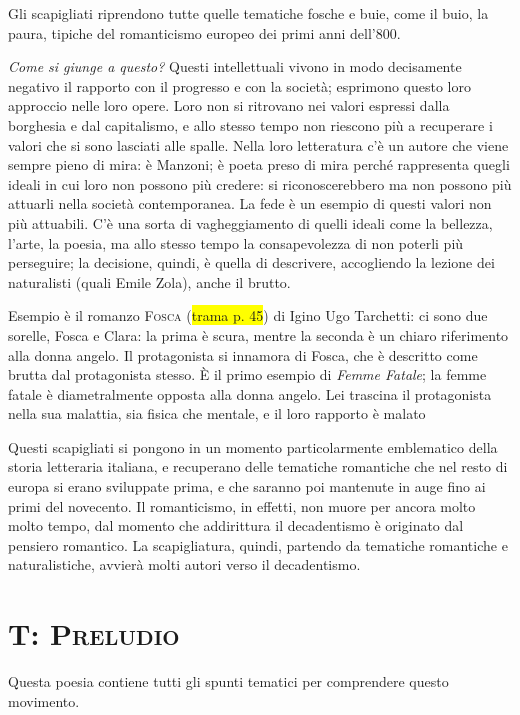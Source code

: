 \documentclass{book}
\newcommand{\pagine}[1]{\colorbox{yellow}{#1}}
\begin{document}
Gli scapigliati riprendono tutte quelle tematiche fosche e buie, come il
buio, la paura, tipiche del romanticismo europeo dei primi anni
dell'800.

\emph{Come si giunge a questo?} Questi intellettuali vivono in modo
decisamente negativo il rapporto con il progresso e con la società;
esprimono questo loro approccio nelle loro opere. Loro non si ritrovano
nei valori espressi dalla borghesia e dal capitalismo, e allo stesso
tempo non riescono più a recuperare i valori che si sono lasciati alle
spalle. Nella loro letteratura c'è un autore che viene sempre pieno di
mira: è Manzoni; è poeta preso di mira perché rappresenta quegli ideali
in cui loro non possono più credere: si riconoscerebbero ma non possono
più attuarli nella società contemporanea. La fede è un esempio di questi
valori non più attuabili. C'è una sorta di vagheggiamento di quelli
ideali come la bellezza, l'arte, la poesia, ma allo stesso tempo la
consapevolezza di non poterli più perseguire; la decisione, quindi, è
quella di descrivere, accogliendo la lezione dei naturalisti (quali
Emile Zola), anche il brutto.

Esempio è il romanzo \textsc{Fosca} (\pagine{trama p. 45}) di Igino Ugo
Tarchetti: ci sono due sorelle, Fosca e Clara: la prima è scura, mentre
la seconda è un chiaro riferimento alla donna angelo. Il protagonista si
innamora di Fosca, che è descritto come brutta dal protagonista stesso.
È il primo esempio di \emph{Femme Fatale}; la femme fatale è
diametralmente opposta alla donna angelo. Lei trascina il protagonista
nella sua malattia, sia fisica che mentale, e il loro rapporto è malato

Questi scapigliati si pongono in un momento particolarmente emblematico
della storia letteraria italiana, e recuperano delle tematiche
romantiche che nel resto di europa si erano sviluppate prima, e che
saranno poi mantenute in auge fino ai primi del novecento. Il
romanticismo, in effetti, non muore per ancora molto molto tempo, dal
momento che addirittura il decadentismo è originato dal pensiero
romantico. La scapigliatura, quindi, partendo da tematiche romantiche e
naturalistiche, avvierà molti autori verso il decadentismo.

\section{T: \scshape{Preludio}}

Questa poesia contiene tutti gli spunti tematici per comprendere questo
movimento.
\end{document}
